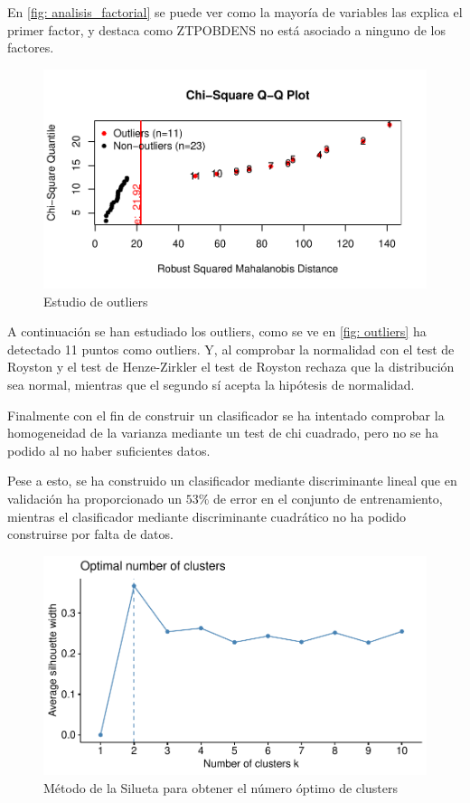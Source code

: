 \documentclass[twoside,openright,titlepage,numbers=noenddot,openany,headinclude,footinclude=true,
cleardoublepage=empty,abstractoff,BCOR=5mm,paper=a4,fontsize=12pt,main=spanish]{scrreprt}
\begin{document}
En \eqref{fig: analisis_factorial} se puede ver como la mayoría de variables las explica el primer factor, y destaca como ZTPOBDENS no está asociado a ninguno de los factores.

\begin{figure}[H]
\includegraphics[scale=1]{outliers.pdf}
\caption{Estudio de outliers}
\label{fig: outliers}
\end{figure}

A continuación se han estudiado los outliers, como se ve en \eqref{fig: outliers} ha detectado 11 puntos como outliers. Y, al comprobar la normalidad con el test de Royston y el test de Henze-Zirkler el test de Royston rechaza que la distribución sea normal, mientras que el segundo sí acepta la hipótesis de normalidad.

Finalmente con el fin de construir un clasificador se ha intentado comprobar la homogeneidad de la varianza mediante un test de chi cuadrado, pero no se ha podido al no haber suficientes datos.

Pese a esto, se ha construido un clasificador mediante discriminante lineal que en validación ha proporcionado un $53\%$ de error en el conjunto de entrenamiento, mientras el clasificador mediante discriminante cuadrático no ha podido construirse por falta de datos.


\begin{figure}[H]
\includegraphics[scale=1]{silhouette.pdf}
\caption{Método de la Silueta para obtener el número óptimo de clusters}
\label{fig: silhouette}
\end{figure}
\end{document}
